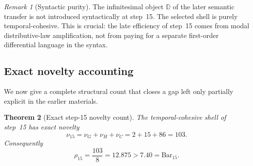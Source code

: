 \documentclass[11pt]{article}
\theoremstyle{plain}
\newtheorem{theorem}{Theorem}[section]
\theoremstyle{definition}
\theoremstyle{remark}
\newtheorem{remark}[theorem]{Remark}
\newcommand{\D}{\mathbb{D}}
\newcommand{\SelBar}{\mathrm{Bar}}
\begin{document}
\begin{remark}[Syntactic purity]
\label{rem:syntactic-purity}
The infinitesimal object $\D$ of the later semantic transfer is not introduced syntactically at step~15. The selected shell is purely temporal-cohesive. This is crucial: the late efficiency of step~15 comes from modal distributive-law amplification, not from paying for a separate first-order differential language in the syntax.
\end{remark}

\subsection{Exact novelty accounting}

We now give a complete structural count that closes a gap left only partially explicit in the earlier materials.

\begin{theorem}[Exact step-15 novelty count]
\label{thm:step15-nu}
The temporal-cohesive shell of step~15 has exact novelty
\[
  \nu_{15}=\nu_G+\nu_H+\nu_C=2+15+86=103.
\]
Consequently
\[
  \rho_{15}=\frac{103}{8}=12.875>7.40=\SelBar_{15}.
\]
\end{theorem}
\end{document}
